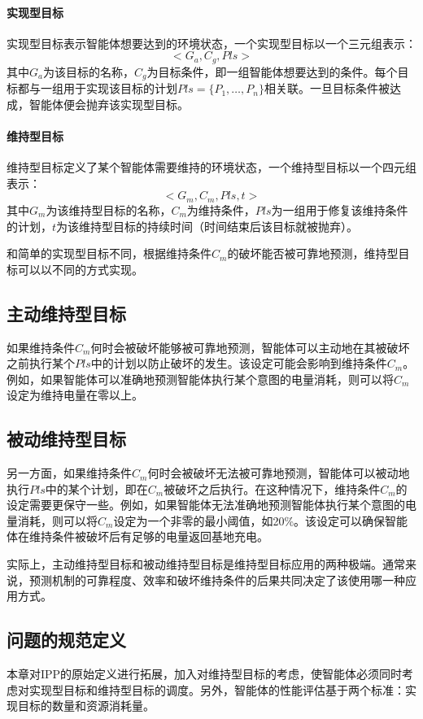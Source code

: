 \paragraph{实现型目标}
实现型目标表示智能体想要达到的环境状态，一个实现型目标以一个三元组表示：
$$<G_a,C_g,Pls>$$
其中$G_a$为该目标的名称，$C_g$为目标条件，即一组智能体想要达到的条件。每个目标都与一组用于实现该目标的计划$Pls=\{P_1,\dots,P_n\}$相关联。一旦目标条件被达成，智能体便会抛弃该实现型目标。
\paragraph{维持型目标}
维持型目标定义了某个智能体需要维持的环境状态\cite{DBLP:journals/ci/DuffTH14}，一个维持型目标以一个四元组表示：
$$<G_m,C_m,Pls,t>$$
其中$G_m$为该维持型目标的名称，$C_m$为维持条件，$Pls$为一组用于修复该维持条件的计划，$t$为该维持型目标的持续时间（时间结束后该目标就被抛弃）。

和简单的实现型目标不同，根据维持条件$C_m$的破坏能否被可靠地预测，维持型目标可以以不同的方式实现。
\subsection{主动维持型目标}
如果维持条件$C_m$何时会被破坏能够被可靠地预测，智能体可以主动地在其被破坏之前执行某个$Pls$中的计划以防止破坏的发生。该设定可能会影响到维持条件$C_m$。例如，如果智能体可以准确地预测智能体执行某个意图的电量消耗，则可以将$C_m$设定为维持电量在零以上。
\subsection{被动维持型目标}
另一方面，如果维持条件$C_m$何时会被破坏无法被可靠地预测，智能体可以被动地执行$Pls$中的某个计划，即在$C_m$被破坏之后执行。在这种情况下，维持条件$C_m$的设定需要更保守一些。例如，如果智能体无法准确地预测智能体执行某个意图的电量消耗，则可以将$C_m$设定为一个非零的最小阈值，如20\%。该设定可以确保智能体在维持条件被破坏后有足够的电量返回基地充电。

实际上，主动维持型目标和被动维持型目标是维持型目标应用的两种极端。通常来说，预测机制的可靠程度、效率和破坏维持条件的后果共同决定了该使用哪一种应用方式。

\subsection{问题的规范定义}
本章对IPP的原始定义进行拓展，加入对维持型目标的考虑，使智能体必须同时考虑对实现型目标和维持型目标的调度。另外，智能体的性能评估基于两个标准：实现目标的数量和资源消耗量。

